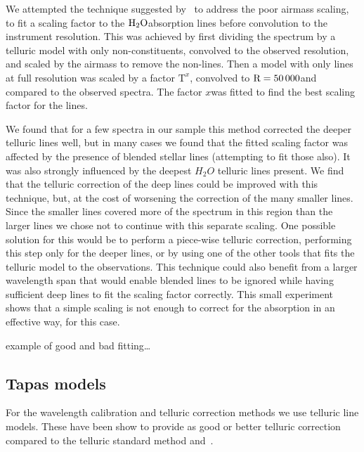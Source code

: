 We attempted the technique suggested by~\citet{bertaux_tapas_2014} to address the poor airmass scaling, to fit a scaling factor to the \(\rm {H}_{2}O\)absorption lines before convolution to the instrument resolution. This was achieved by first dividing the spectrum by a telluric model with only non-constituents, convolved to the observed resolution, and scaled by the airmass to remove the non-lines. Then a model with only lines at full resolution was scaled by a factor \(\textrm{T}^{x}\), convolved to \(\rm R=50\,000\)and compared to the observed spectra. The factor \(x\)was fitted to find the best scaling factor for the lines.

We found that for a few spectra in our sample this method corrected the deeper telluric lines well, but in many cases we found that the fitted scaling factor was affected by the presence of blended stellar lines (attempting to fit those also). It was also strongly influenced by the deepest \(H_{2}O\) telluric lines present. We find that the telluric correction of the deep lines could be improved with this technique, but, at the cost of worsening the correction of the many smaller lines. Since the smaller lines covered more of the spectrum in this region than the larger lines we chose not to continue with this separate scaling. One possible solution for this would be to perform a piece-wise telluric correction, performing this step only for the deeper  lines, or by using one of the other tools that fits the telluric model to the observations. This technique could also benefit from a larger wavelength span that would enable blended lines to be ignored while having sufficient deep  lines to fit the scaling factor correctly. This small experiment shows that a simple scaling is not enough to correct for the absorption in an effective way, for this case.



 example of good and bad fitting\ldots


\subsection{Tapas models}
\label{subsec:tapas_models_usage}
For the wavelength calibration and telluric correction methods we use telluric line models. These have been show to provide as good or better telluric correction compared to the telluric standard method and~\citep{ulmer-moll_telluric_2018}.

